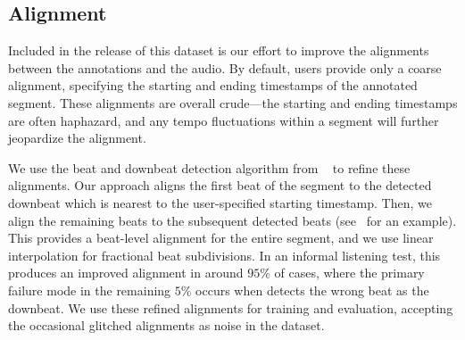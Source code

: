 \subsection{Alignment}

Included in the release of this dataset is our effort to improve the alignments between the annotations and the audio. 
By default, \hooktheory{} users provide only a coarse alignment, specifying the starting and ending timestamps of the annotated segment. 
These alignments are overall crude---the starting and ending timestamps are often haphazard, and any tempo fluctuations within a segment will further jeopardize the alignment.

We use the beat and downbeat detection algorithm from \madmom{}~\cite{bock2016joint,bock2016madmom} to refine these alignments. 
Our approach aligns the first beat of the segment to the detected downbeat which is nearest to the user-specified starting timestamp. 
Then, we align the remaining beats to the subsequent detected beats (see~ for an example). 
This provides a beat-level alignment for the entire segment, and we use linear interpolation for fractional beat subdivisions. 
In an informal listening test, this produces an improved alignment in around $95\%$ of cases, where the primary failure mode in the remaining $5\%$ occurs when \madmom{} detects the wrong beat as the downbeat. 
We use these refined alignments for training and evaluation, accepting the occasional glitched alignments as noise in the dataset.
